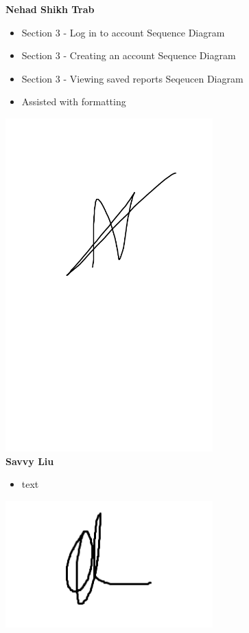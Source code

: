 \documentclass[]{article}
\numberwithin{figure}{section}
\begin{document}
\textbf{Nehad Shikh Trab}
\begin{itemize}
    \setlength\itemindent{2em}
    \item Section 3 - Log in to account Sequence Diagram
    \item Section 3 - Creating an account Sequence Diagram
    \item Section 3 - Viewing saved reports Seqeucen Diagram
    \item Assisted with formatting
\end{itemize}
\includegraphics[width=0.6\textwidth]{Nehad.png}
\\
\textbf{Savvy Liu}
\begin{itemize}
    \setlength\itemindent{2em}
    \item text
\end{itemize} 
\includegraphics[width=0.6\textwidth]{Savvy.png}
\\
\end{document}
